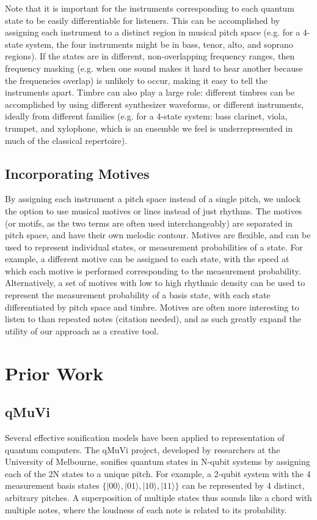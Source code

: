 \documentclass[10pt,twocolumn]{article}
\begin{document}
Note that it is important for the instruments corresponding to each quantum state to be easily differentiable for listeners. This can be accomplished by assigning each instrument to a distinct region in musical pitch space (e.g. for a 4-state system, the four instruments might be in bass, tenor, alto, and soprano regions). If the states are in different, non-overlapping frequency ranges, then frequency masking (e.g. when one sound makes it hard to hear another because the frequencies overlap) is unlikely to occur, making it easy to tell the instruments apart\cite{smyth2019}. Timbre can also play a large role: different timbres can be accomplished by using different synthesizer waveforms, or different instruments, ideally from different families (e.g. for a 4-state system: bass clarinet, viola, trumpet, and xylophone, which is an ensemble we feel is underrepresented in much of the classical repertoire).

\subsection{Incorporating Motives}

By assigning each instrument a pitch space instead of a single pitch, we unlock the option to use musical motives or lines instead of just rhythms. The motives (or motifs, as the two terms are often used interchangeably) are separated in pitch space, and have their own melodic contour. Motives are flexible, and can be used to represent individual states, or measurement probabilities of a state. For example, a different motive can be assigned to each state, with the speed at which each motive is performed corresponding to the measurement probability. Alternatively, a set of motives with low to high rhythmic density can be used to represent the measurement probability of a basis state, with each state differentiated by pitch space and timbre. Motives are often more interesting to listen to than repeated notes (citation needed), and as such greatly expand the utility of our approach as a creative tool.

\section{Prior Work}

\subsection{qMuVi}

Several effective sonification models have been applied to representation of quantum computers. The qMuVi\cite{qmuvi} project, developed by researchers at the University of Melbourne, sonifies quantum states in N-qubit systems by assigning each of the 2N states to a unique pitch. For example, a 2-qubit system with the 4 measurement basis states $\{|00\rangle, |01\rangle, |10\rangle, |11\rangle\}$ can be represented by 4 distinct, arbitrary pitches. A superposition of multiple states thus sounds like a chord with multiple notes, where the loudness of each note is related to its probability.
\end{document}
